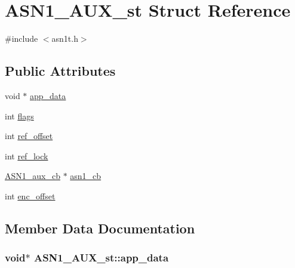 \hypertarget{struct_a_s_n1___a_u_x__st}{}\section{A\+S\+N1\+\_\+\+A\+U\+X\+\_\+st Struct Reference}
\label{struct_a_s_n1___a_u_x__st}


{\ttfamily \#include $<$asn1t.\+h$>$}

\subsection*{Public Attributes}
\begin{DoxyCompactItemize}
\item 
void $\ast$ \hyperlink{struct_a_s_n1___a_u_x__st_af83d68015a2f496a759c6973b13a9d97}{app\+\_\+data}
\item 
int \hyperlink{struct_a_s_n1___a_u_x__st_a852e7951bbea693ec9616bac686455c6}{flags}
\item 
int \hyperlink{struct_a_s_n1___a_u_x__st_a7bf75280ea384bfda6f280e97a214f8a}{ref\+\_\+offset}
\item 
int \hyperlink{struct_a_s_n1___a_u_x__st_ab8dd18bd614e4346bae42e2da5046be6}{ref\+\_\+lock}
\item 
\hyperlink{asn1t_8h_a2b027ba8d1c547004686872d2ce6a295}{A\+S\+N1\+\_\+aux\+\_\+cb} $\ast$ \hyperlink{struct_a_s_n1___a_u_x__st_a1972a608ed6091b6b830839b785b74e8}{asn1\+\_\+cb}
\item 
int \hyperlink{struct_a_s_n1___a_u_x__st_a71b62b72c2eff33605ff2e3f4d833c15}{enc\+\_\+offset}
\end{DoxyCompactItemize}


\subsection{Member Data Documentation}
\subsubsection[{\texorpdfstring{app\+\_\+data}{app_data}}]{\setlength{\rightskip}{0pt plus 5cm}void$\ast$ A\+S\+N1\+\_\+\+A\+U\+X\+\_\+st\+::app\+\_\+data}\hypertarget{struct_a_s_n1___a_u_x__st_af83d68015a2f496a759c6973b13a9d97}{}\label{struct_a_s_n1___a_u_x__st_af83d68015a2f496a759c6973b13a9d97}
